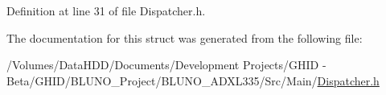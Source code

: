 \-Definition at line 31 of file \-Dispatcher.\-h.



\-The documentation for this struct was generated from the following file\-:\begin{DoxyCompactItemize}
\item 
/\-Volumes/\-Data\-H\-D\-D/\-Documents/\-Development Projects/\-G\-H\-I\-D -\/ Beta/\-G\-H\-I\-D/\-B\-L\-U\-N\-O\-\_\-\-Project/\-B\-L\-U\-N\-O\-\_\-\-A\-D\-X\-L335/\-Src/\-Main/\hyperlink{_dispatcher_8h}{\-Dispatcher.\-h}\end{DoxyCompactItemize}
